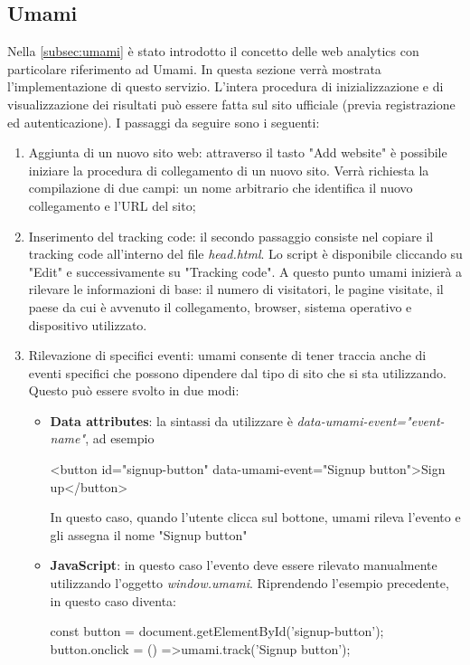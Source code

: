 \documentclass[target=bach,aauheader=]{thud}
\begin{document}
\subsection{Umami}
Nella \cref{subsec:umami} è stato introdotto il concetto delle web analytics con particolare riferimento ad Umami. In questa sezione verrà mostrata l'implementazione di questo servizio. 
\newline \newline
L'intera procedura di inizializzazione e di visualizzazione dei risultati può essere fatta sul sito ufficiale (previa registrazione ed autenticazione). I passaggi da seguire sono i seguenti:
\begin{enumerate}
    \item Aggiunta di un nuovo sito web: attraverso il tasto "Add website" è possibile iniziare la procedura di collegamento di un nuovo sito. 
          Verrà richiesta la compilazione di due campi: un nome arbitrario che identifica il nuovo collegamento e l'URL del sito;
    \item Inserimento del tracking code: il secondo passaggio consiste nel copiare il tracking code all'interno del file \textit{head.html}. Lo script è disponibile cliccando su "Edit" e successivamente su "Tracking code".
          A questo punto umami inizierà a rilevare le informazioni di base: il numero di visitatori, le pagine visitate, il paese da cui è avvenuto il collegamento, browser, sistema operativo e dispositivo utilizzato.
    \item Rilevazione di specifici eventi: umami consente di tener traccia anche di eventi specifici che possono dipendere dal tipo di sito che si sta utilizzando. Questo può essere svolto in due modi:
    \begin{itemize}
        \item \textbf{Data attributes}: la sintassi da utilizzare è \textit{data-umami-event="{event-name}"}, ad esempio 
        \begin{center}
        \textless button id="signup-button" data-umami-event="Signup button"\textgreater Sign up\textless /button\textgreater
        \end{center}
        In questo caso, quando l'utente clicca sul bottone, umami rileva l'evento e gli assegna il nome "Signup button"
        \item \textbf{JavaScript}: in questo caso l'evento deve essere rilevato manualmente utilizzando l'oggetto \textit{window.umami}. Riprendendo l'esempio precedente, in questo caso diventa:
        \begin{center}
            const button = document.getElementById('signup-button');
            \newline
            button.onclick = () =\textgreater umami.track('Signup button');
        \end{center}
    \end{itemize}
\end{enumerate}
\end{document}
